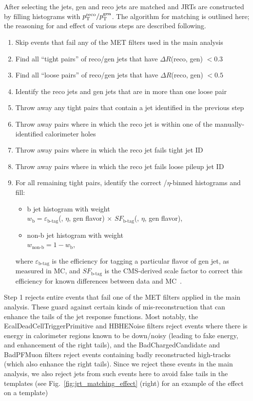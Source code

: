 After selecting the jets, gen and reco jets are matched and JRTs are constructed by 
filling histograms with $p_{\mathrm{T}}^\text{reco}/p_{\mathrm{T}}^\text{gen}$.
The algorithm for matching is outlined here; the reasoning for and effect of various steps are described following.
\begin{enumerate}
\item Skip events that fail any of the MET filters used in the main analysis
\item Find all ``tight pairs'' of reco/gen jets that have $\Delta R$(reco, gen) $<0.3$
\item Find all ``loose pairs'' of reco/gen jets that have $\Delta R$(reco, gen) $<0.5$
\item Identify the reco jets and gen jets that are in more than one loose pair
\item Throw away any tight pairs that contain a jet identified in the previous step
\item Throw away pairs where in which the reco jet is within one of the manually-identified calorimeter holes
\item Throw away pairs where in which the reco jet fails tight jet ID
\item Throw away pairs where in which the reco jet fails loose pileup jet ID
\item For all remaining tight pairs, identify the correct \pt/$\eta$-binned histograms and fill:
  \begin{itemize}
    \item b jet histogram with weight \\
    \hphantom{1 cm}$w_\text{b}=\varepsilon_\text{b-tag}$(\pt, $\eta$, gen flavor) $\times$ $SF_\text{b-tag}$(\pt, $\eta$, gen flavor),
    \item non-b jet histogram with weight \\
    \hphantom{1 cm}$w_\text{non-b} = 1-w_\text{b}$,
  \end{itemize}
  where $\varepsilon_\text{b-tag}$ is the efficiency for tagging a particular flavor of gen jet, as measured in MC, and $SF_\text{b-tag}$ is 
  the CMS-derived scale factor to correct this efficiency for known differences between data and MC~\cite{BtagSFMethods}.
\end{enumerate}

Step 1 rejects entire events that fail one of the MET filters applied in the main analysis.
These guard against certain kinds of mis-reconstruction that can enhance the tails of the
jet response functions. Most notably, the EcalDeadCellTriggerPrimitive and HBHENoise filters
reject events where there is energy in calorimeter regions known to be down/noisy (leading to 
fake energy, and enhancement of the right tails), and the BadChargedCandidate and BadPFMuon
filters reject events containing badly reconstructed high-\pt tracks (which also enhance
the right tails). Since we reject these events in the main analysis, we also reject
jets from such events here to avoid false tails in the templates 
(see Fig.~\ref{fig:jrt_matching_effect} (right) for an example of the effect on a template)

